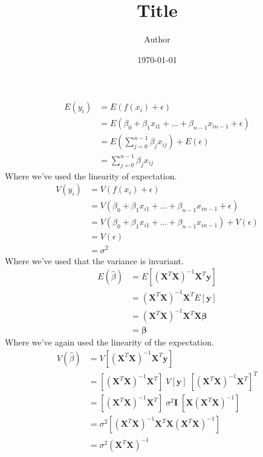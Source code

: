 \documentclass[11pt,a4paper,oldfontcommands]{memoir}
\title{Title}
\author{Author}
\date{\today}
\begin{document}
\begin{align*}
    E(y_i) &= E(f(x_i) + \epsilon)\\
    &= E(\beta_0 + \beta_1x_{i1} + \dots + \beta_{n-1} x_{i n-1} + \epsilon)\\
    &= E\left(\sum_{j=0}^{n-1}\beta_{j}x_{ij}\right) + E(\epsilon)\\
    &= \sum_{j=0}^{n-1}\beta_{j}x_{ij}
\end{align*}
Where we've used the linearity of expectation.\\[10pt]
%
\begin{align*}
    V(y_i) &= V(f(x_i) + \epsilon)\\
    &= V(\beta_0 + \beta_1x_{i1} + \dots + \beta_{n-1} x_{i n-1} + \epsilon)\\
    &= V(\beta_0 + \beta_1x_{i1} + \dots + \beta_{n-1} x_{i n-1}) + V(\epsilon)\\
    &= V(\epsilon)\\
    &= \sigma^2
\end{align*}
Where we've used that the variance is invariant.\\[20pt]
%
\begin{align*}
    E(\hat \beta) &= E[(\boldsymbol{X}^T \boldsymbol{X})^{-1}\boldsymbol{X}^T \boldsymbol{y}]\\
    &= (\boldsymbol{X}^T \boldsymbol{X})^{-1}\boldsymbol{X}^T E[\boldsymbol{y}]\\
    &= (\boldsymbol{X}^T \boldsymbol{X})^{-1}\boldsymbol{X}^T \boldsymbol{X \beta}\\
    &= \boldsymbol{\beta}
\end{align*}
Where we've again used the linearity of the expectation.\\[10pt]
%
\begin{align*}
    V(\hat \beta) &= V[(\boldsymbol{X}^T\boldsymbol{X})^{-1} \boldsymbol{X}^T\boldsymbol{y}]\\
    &= [(\boldsymbol{X}^T\boldsymbol{X})^{-1} \boldsymbol{X}^T] \; V[\boldsymbol{y}] \;
    [(\boldsymbol{X}^T\boldsymbol{X})^{-1} \boldsymbol{X}^T]^T\\
    &= [(\boldsymbol{X}^T\boldsymbol{X})^{-1} \boldsymbol{X}^T] \; \sigma^2 \boldsymbol{I} \;
    [\boldsymbol{X}(\boldsymbol{X}^T\boldsymbol{X})^{-1}]\\
    &= \sigma^2 [(\boldsymbol{X}^T\boldsymbol{X})^{-1} \boldsymbol{X}^T
    \boldsymbol{X}(\boldsymbol{X}^T\boldsymbol{X})^{-1}]\\
    &= \sigma^2 (\boldsymbol{X}^T\boldsymbol{X})^{-1}
\end{align*}
\end{document}
